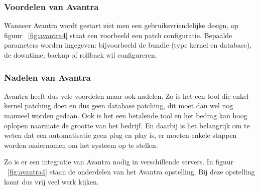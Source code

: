 \subsubsection{Voordelen van Avantra}
Wanneer Avantra wordt gestart ziet men een gebruiksvriendelijke design, op figuur ~\ref{fig:avantra4} staat een voorbeeld een patch configuratie. Bepaalde parameters worden ingegeven: bijvoorbeeld de bundle (type kernel en database), de downtime, backup of 
 rollback wil configureren. \\ 

\subsubsection{Nadelen van Avantra}
Avantra heeft dus vele voordelen maar ook nadelen. Zo is het een tool die enkel kernel patching doet en dus geen database patching, dit moet dan wel nog manueel worden gedaan. Ook is het een betalende tool en het bedrag kan hoog oplopen naarmate de grootte van het bedrijf.
En daarbij is het belangrijk om te weten dat een automatisatie geen plug en play is, er moeten enkele stappen worden ondernomen om het systeem op te stellen.

Zo is er een integratie van Avantra nodig in verschillende servers. In figuur ~\ref{fig:avantra4} staan de onderdelen van het Avantra opstelling. Bij deze opstelling komt dus vrij veel werk kijken.